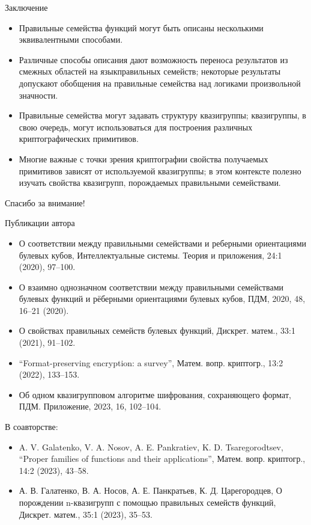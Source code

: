 \begin{frame}{Заключение}
    \begin{itemize}
        \item Правильные семейства функций могут быть описаны несколькими эквивалентными способами.
        \pause 
        \item Различные способы описания дают возможность переноса результатов из смежных областей на \guillemotleft язык\guillemotright правильных семейств; некоторые результаты допускают обобщения на правильные семейства над логиками произвольной значности.
        \pause 
        \item Правильные семейства могут задавать структуру квазигруппы; квазигруппы, в свою очередь, могут использоваться для построения различных криптографических примитивов.
        \pause 
        \item Многие важные с точки зрения криптографии свойства получаемых примитивов зависят от используемой квазигруппы; в этом контексте полезно изучать свойства квазигрупп, порождаемых правильными семействами.
    \end{itemize}
\end{frame}


\begin{frame}
    \begin{center}
        \Large{Спасибо за внимание!}
    \end{center}
\end{frame}


\begin{frame}{Публикации автора}
    \begin{itemize}
        \item \guillemotleft  О соответствии между правильными семействами и реберными ориентациями булевых кубов\guillemotright, Интеллектуальные системы. Теория и приложения, 24:1 (2020), 97--100.
        \item \guillemotleft О взаимно однозначном соответствии между правильными семействами булевых функций и рёберными ориентациями булевых кубов\guillemotright, ПДМ, 2020, 48,  16--21 (2020).
        \item \guillemotleft О свойствах правильных семейств булевых функций\guillemotright, Дискрет. матем., 33:1 (2021), 91--102.
        \item ``Format-preserving encryption: a survey'', Матем. вопр. криптогр., 13:2 (2022),  133--153.
        \item \guillemotleft Об одном квазигрупповом алгоритме шифрования, сохраняющего формат\guillemotright, ПДМ. Приложение, 2023, 16,  102--104.
    \end{itemize}
    В соавторстве:
    \begin{itemize}
        \item A. V. Galatenko, V. A. Nosov, A. E. Pankratiev, K. D. Tsaregorodtsev, ``Proper families of functions and their applications'', Матем. вопр. криптогр., 14:2 (2023),  43--58.
        \item А. В. Галатенко, В. А. Носов, А. Е. Панкратьев, К. Д. Царегородцев, \guillemotleft О порождении n-квазигрупп с помощью правильных семейств функций\guillemotright, Дискрет. матем., 35:1 (2023),  35--53.
    \end{itemize}
\end{frame}
